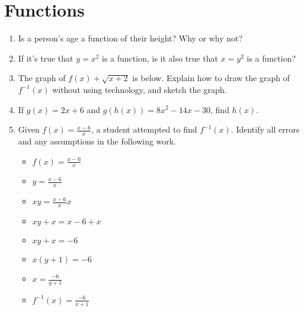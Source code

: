 \documentclass[11pt]{article}
\begin{document}
\section*{Functions}
\begin{enumerate}
\item Is a person's age a function of their height? Why or why not?
\item If it's true that $y = x^2$ is a function, is it also true that $x = y^2$ is a function?
\item The graph of $f(x) + \sqrt{x+2}$ is below. Explain how to draw the graph of $f^{-1}(x)$ without using technology, and sketch the graph.
\\
\item If $g(x) = 2x + 6$ and $g(h(x)) = 8x^2 - 14x - 30$, find $h(x)$.
\item  Given $f(x)= \frac{x-6}{x}$, a student attempted to find $f^{-1}(x)$. Identify all errors and any assumptions in the following work.
\begin{itemize}
\item $f(x) = \frac{x-6}{x}$
\item $y = \frac{x-6}{x}$
\item $xy = \frac{x-6}{x} x$
\item $xy + x = x-6 +x$
\item $xy + x = -6$
\item $x(y+1) = -6$
\item $x = \frac{-6}{y+1}$
\item $f^{-1}(x) = \frac{-6}{x+1}$
\end{itemize}
\end{enumerate}
\end{document}
